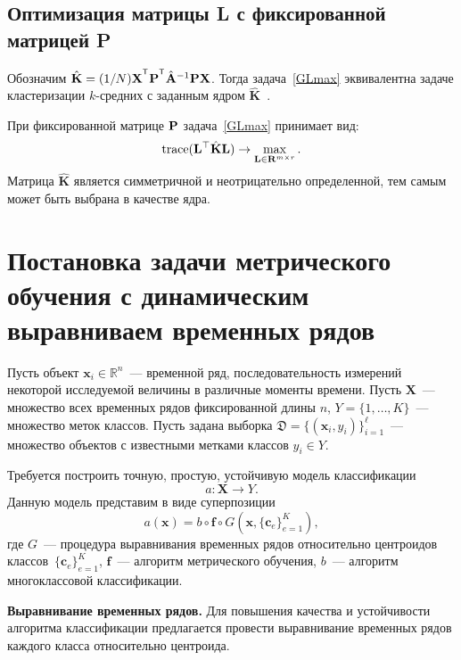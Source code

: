 \subsection*{Оптимизация матрицы L с фиксированной матрицей P}
\begin{theorem}
	Обозначим $\hat{\mathbf{K}} = (1/N)\bX^{\T} \bP^{\T} \hat{\mathbf{A}}^{-1} \bP \bX$.
	Тогда задача~\eqref{GLmax} эквивалентна задаче кластеризации $k$-средних с заданным ядром $\hat{\mathbf{K}}$~\cite{shawe2004kernel}.
\end{theorem}

При фиксированной матрице $\mathbf{P}$ задача~\eqref{GLmax} принимает вид:
\begin{equation*}
\text{trace} (\mathbf{L}^{\top} \hat{\mathbf{K}} \mathbf{L}) \to \max_{\mathbf{L} \in \mathbf{R}^{m \times r}}.
\end{equation*}
Матрица $\hat{\mathbf{K}}$ является симметричной и неотрицательно определенной, тем самым может быть выбрана в качестве ядра.

\section{Постановка задачи метрического обучения с динамическим выравниваем временных рядов}
\label{sec:ch5:metric_learning_classification}

Пусть объект $\mathbf{x}_i \in \mathbb{R}^n$~--- временной ряд, последовательность измерений некоторой исследуемой величины в различные моменты времени.
Пусть $\mathbf{X}$~--- множество всех временных рядов фиксированной длины $n$, $Y = \{1, \dots, K\}$~--- множество меток классов.
Пусть задана выборка $\mathfrak{D} = \{(\mathbf{x}_i, y_i)\}_{i=1}^\ell$~--- множество объектов с известными метками классов $y_i \in Y$.

Требуется построить точную, простую, устойчивую модель классификации
\[
a: \mathbf{X} \to Y.
\]
Данную модель представим в виде суперпозиции
\begin{equation}
\label{ch4:eq:classifiers}
a(\mathbf{x}) = b \circ \mathbf{f} \circ G(\mathbf{x}, \{\mathbf{c}_e\}_{e = 1} ^ K),
\end{equation}
где $G$~--- процедура выравнивания временных рядов относительно центроидов классов~$\{\mathbf{c}_e\}_{e = 1} ^ K$, $\mathbf{f}$~--- алгоритм метрического обучения, $b$~--- алгоритм многоклассовой классификации.

\textbf{Выравнивание временных рядов.}
Для повышения качества и устойчивости алгоритма классификации предлагается провести выравнивание временных рядов каждого класса относительно центроида.

